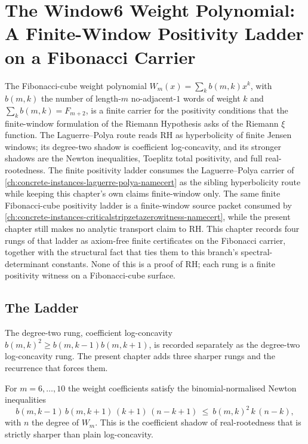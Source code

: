 \chapter{The Window6 Weight Polynomial: A Finite-Window Positivity Ladder on a Fibonacci Carrier}
\label{ch:concrete-instances-window6-weight-finite-window-rh-ladder}

The Fibonacci-cube weight polynomial $W_m(x)=\sum_k b(m,k)x^k$, with $b(m,k)$ the number of length-$m$ no-adjacent-$1$ words of weight $k$ and $\sum_k b(m,k)=F_{m+2}$, is a finite carrier for the positivity conditions that the finite-window formulation of the Riemann Hypothesis asks of the Riemann $\xi$ function. The Laguerre--Polya route reads $\mathrm{RH}$ as hyperbolicity of finite Jensen windows; its degree-two shadow is coefficient log-concavity, and its stronger shadows are the Newton inequalities, Toeplitz total positivity, and full real-rootedness. The finite positivity ladder consumes the Laguerre--Polya carrier of \autoref{ch:concrete-instances-laguerre-polya-namecert} as the sibling hyperbolicity route while keeping this chapter's own claims finite-window only. The same finite Fibonacci-cube positivity ladder is a finite-window source packet consumed by \autoref{ch:concrete-instances-criticalstripzetazerowitness-namecert}, while the present chapter still makes no analytic transport claim to $\mathrm{RH}$. This chapter records four rungs of that ladder as axiom-free finite certificates on the Fibonacci carrier, together with the structural fact that ties them to this branch's spectral-determinant constants. None of this is a proof of $\mathrm{RH}$; each rung is a finite positivity witness on a Fibonacci-cube surface.

\section{The Ladder}
\label{sec:window6-weight-rh-ladder}

The degree-two rung, coefficient log-concavity $b(m,k)^2\ge b(m,k-1)b(m,k+1)$, is recorded separately as the degree-two log-concavity rung. The present chapter adds three sharper rungs and the recurrence that forces them.

\begin{theorem}
\label{thm:window6-weight-newton-ultra}
For $m=6,\ldots,10$ the weight coefficients satisfy the binomial-normalised Newton inequalities
$$
b(m,k-1)\,b(m,k+1)\,(k+1)\,(n-k+1)\ \le\ b(m,k)^2\,k\,(n-k),
$$
with $n$ the degree of $W_m$. This is the coefficient shadow of real-rootedness that is strictly sharper than plain log-concavity.
\end{theorem}

